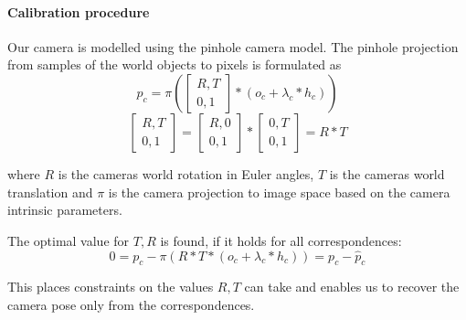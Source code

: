 
\paragraph{Calibration procedure}
  
Our camera is modelled using the pinhole camera model. 
The pinhole projection from samples of the world objects to pixels is formulated as
\begin{equation}
  \label{eq:static_calibration_reprojection}
  p_c = \pi \left(  
    \begin{bmatrix}
      R, T \\
      0, 1
    \end{bmatrix} *
    (o_c + \lambda_c * h_c)
  \right)
\end{equation}
\begin{equation}
    \begin{bmatrix}
      R, T \\
      0, 1
    \end{bmatrix} = 
    \begin{bmatrix}
      R, 0 \\
      0, 1
    \end{bmatrix} *
    \begin{bmatrix}
      0, T \\
      0, 1
    \end{bmatrix} =
    R * T
\end{equation}

where $R$ is the cameras world rotation in Euler angles, $T$ is the cameras world translation and $\pi$ is the camera projection to image space based on the camera intrinsic parameters.

The optimal value for $T,R$ is found, if it holds for all correspondences:
\begin{equation}
  0 = p_c - \pi \left( R * T * (o_c + \lambda_c * h_c)\right) = p_c - \hat{p}_c
\end{equation}

This places constraints on the values $R, T$ can take and enables us to recover the camera pose only from the correspondences.

